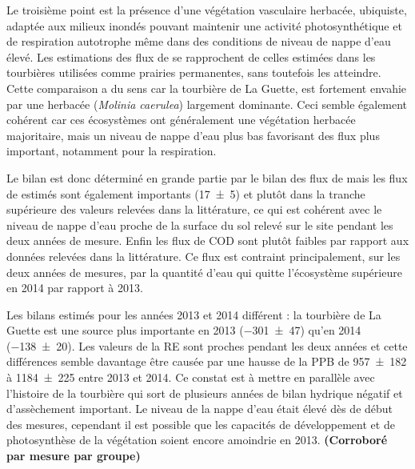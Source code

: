 Le troisième point est la présence d'une végétation vasculaire herbacée, ubiquiste, adaptée aux milieux inondés pouvant maintenir une activité photosynthétique et de respiration autotrophe même dans des conditions de niveau de nappe d'eau élevé.
Les estimations des flux de \coo se rapprochent de celles estimées dans les tourbières utilisées comme prairies permanentes, sans toutefois les atteindre.
Cette comparaison a du sens car la tourbière de La Guette, est fortement envahie par une herbacée (\textit{Molinia caerulea}) largement dominante.
Ceci semble également cohérent car ces écosystèmes ont généralement une végétation herbacée majoritaire, mais un niveau de nappe d'eau plus bas favorisant des flux plus important, notamment pour la respiration.

Le bilan est donc déterminé en grande partie par le bilan des flux de \coo mais les flux de \chh estimés sont également importants (\SI{17(5)}{\gcma}) et plutôt dans la tranche supérieure des valeurs relevées dans la littérature, ce qui est cohérent avec le niveau de nappe d'eau proche de la surface du sol relevé sur le site pendant les deux années de mesure.
Enfin les flux de COD sont plutôt faibles par rapport aux données relevées dans la littérature.
Ce flux est contraint principalement, sur les deux années de mesures, par la quantité d'eau qui quitte l'écosystème supérieure en 2014 par rapport à 2013.

Les bilans estimés pour les années 2013 et 2014 différent : la tourbière de La Guette est une source plus importante en 2013 (\SI{-301(47)}{\gcma}) qu'en 2014 (\SI{-138(20)}{\gcma}).
Les valeurs de la RE sont proches pendant les deux années et cette différences semble davantage être causée par une hausse de la PPB de \num{957(182)} à \SI{1184(225)}{\gcma} entre 2013 et 2014.
Ce constat est à mettre en parallèle avec l'histoire de la tourbière qui sort de plusieurs années de bilan hydrique négatif et d'assèchement important.
Le niveau de la nappe d'eau était élevé dès de début des mesures, cependant il est possible que les capacités de développement et de photosynthèse de la végétation soient encore amoindrie en 2013.
\textbf{(Corroboré par mesure par groupe)}





